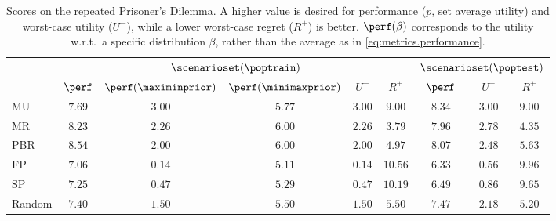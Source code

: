 \begin{table}[t]
    \setlength{\tabcolsep}{6pt}
    \centering
    \caption{
    Scores on the repeated Prisoner's Dilemma. A higher value is desired for performance ($p$, set average utility) and worst-case utility ($U^-$), while a lower worst-case regret ($R^+$) is better. $\perf(\beta)$ corresponds to the utility w.r.t.\ a specific distribution $\beta$, rather than the average as in \eqref{eq:metrics.performance}.}
    \label{tab:prisoner.train}
    \begin{tabular}{lcccccccc}\toprule
    & \multicolumn{5}{c}{$\scenarioset(\poptrain)$} & \multicolumn{3}{c}{$\scenarioset(\poptest)$}\\
    \cmidrule(lr){2-6}\cmidrule(lr){7-9}
               & $\perf$  & $\perf(\maximinprior)$ & $\perf(\minimaxprior)$ & $U^-$ & $R^+$ & $\perf$ & $U^-$ & $R^+$ \\ \midrule
        MU  & $7.69$ & $\mathbf{3.00}$ & $5.77$ & $\mathbf{3.00}$ & $9.00$ & $\mathbf{8.34}$ & $\mathbf{3.00}$ & $9.00$\\
        MR  & $8.23$ & $2.26$ & $\mathbf{6.00}$ & $2.26$ & $\mathbf{3.79}$ & $7.96$ & $2.78$ & $\mathbf{4.35}$\\ \hdashline
        PBR  & $\mathbf{8.54}$ & $2.00$ & $\mathbf{6.00}$ & $2.00$ & $4.97$ & $8.07$ & $2.48$ & $5.63$\\
        FP & $7.06$ & $0.14$ & $5.11$ & $0.14$ & $10.56$ & $6.33$ & $0.56$ & $9.96$\\
        SP  & $7.25$ & $0.47$ & $5.29$ & $0.47$ & $10.19$ & $6.49$ & $0.86$ & $9.65$\\
        Random & $7.40$ & $1.50$ & $5.50$ & $1.50$ & $5.50$ & $7.47$ & $2.18$ & $5.20$\\
    \bottomrule
    \end{tabular}
\end{table}